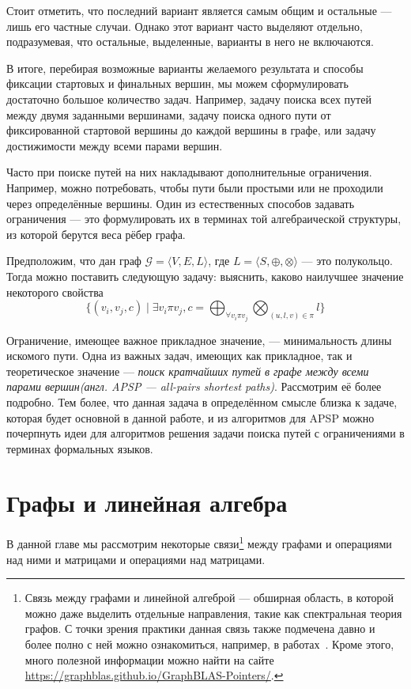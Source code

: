 Стоит отметить, что последний вариант является самым общим и остальные --- лишь его частные случаи. 
Однако этот вариант часто выделяют отдельно, подразумевая, что остальные, выделенные, варианты в него не включаются.

В итоге, перебирая возможные варианты желаемого результата и способы фиксации стартовых и финальных вершин, мы можем сформулировать достаточно большое количество задач. Например, задачу поиска всех путей между двумя заданными вершинами, задачу поиска одного пути от фиксированной стартовой вершины до каждой вершины в графе, или задачу достижимости между всеми парами вершин.

Часто при поиске путей на них накладывают дополнительные ограничения. Например, можно потребовать, чтобы пути были простыми или не проходили через определённые вершины. Один из естественных способов задавать ограничения --- это формулировать их в терминах той алгебраической структуры, из которой берутся веса рёбер графа. 

Предположим, что дан граф $\mathcal{G} = \langle V, E, L\rangle $, где $L = \langle S, \oplus, \otimes \rangle$ --- это полукольцо. Тогда можно поставить следующую задачу: выяснить, каково наилучшее значение некоторого свойства $$ \{(v_i, v_j, c) \mid \exists v_i \pi v_j, c = \bigoplus_{\forall v_i \pi v_j} \bigotimes_{(u,l,v) \in \pi } l \} $$

Ограничение, имеющее важное прикладное значение, --- минимальность длины искомого пути.
Одна из важных задач, имеющих как прикладное, так и теоретическое значение --- \textit{поиск кратчайших путей в графе между всеми парами вершин(англ. APSP --- all-pairs shortest paths)}. Рассмотрим её более подробно. Тем более, что данная задача в определённом смысле близка к задаче, которая будет основной в данной работе, и из алгоритмов для APSP можно почерпнуть идеи для алгоритмов решения задачи поиска путей с ограничениями в терминах формальных языков.

\section{Графы и линейная алгебра}

В данной главе мы рассмотрим некоторые связи\footnote{Связь между графами и линейной алгеброй --- обширная область, в которой можно даже выделить отдельные направления, такие как спектральная теория графов. С точки зрения практики данная связь также подмечена давно и более полно с ней можно ознакомиться, например, в работах~\cite{doi:10.1137/1.9780898719918, Davis2018Algorithm9S}. Кроме этого, много полезной информации можно найти на сайте \url{https://graphblas.github.io/GraphBLAS-Pointers/}.} между графами и операциями над ними и матрицами и операциями над матрицами. 

